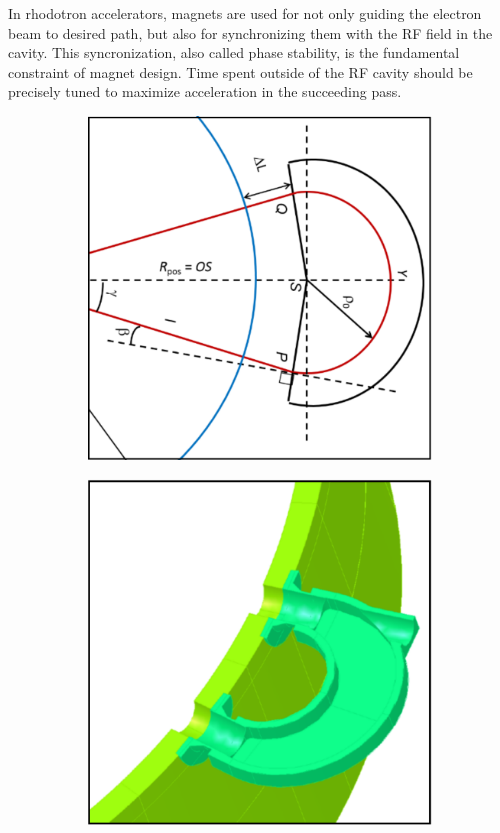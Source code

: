 \documentclass[a4paper,oneside,12pt]{report}
\numberwithin{equation}{chapter}
\begin{document}
In rhodotron accelerators, magnets are used for not only guiding the electron beam to desired path, but also for synchronizing them with the RF field in the cavity. 
This syncronization, also called phase stability, is the fundamental constraint of magnet design. 
Time spent outside of the RF cavity should be precisely tuned to maximize acceleration in the succeeding pass. 
\iffalse \begin{figure}[H]
    \centering
    \begin{subfigure}{.5\textwidth}
      \centering
      \includegraphics[width=.9\linewidth]{./figures/design/Ltot.png}
    \end{subfigure}%
    \centering
    \begin{subfigure}{.5\textwidth}
      \centering
      \includegraphics[width=.9\linewidth]{./figures/design/tt300_mag.png}

\end{subfigure}
\end{figure}
\end{document}
